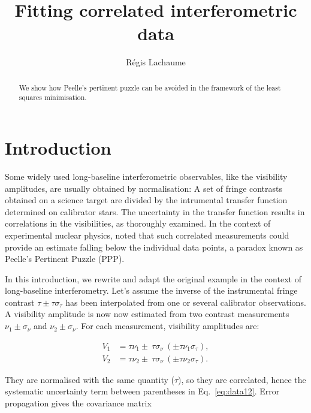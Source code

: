 \documentclass[twocolumn]{article}
\def\norm{_\tau}
\def\meas{_\nu}
\def\system#1#2#3{\ensuremath{#1 \pm\ #2\ (\pm #3)}}
\def\raw{\ensuremath{\nu}}
\def\cot{\ensuremath{\tau}}
\def\data{\ensuremath{{\scriptstyle V}}}
\def\dev{\ensuremath{\sigma}}
\def\reldev{\ensuremath{\dev\norm}}
\def\absdev{\ensuremath{\dev\meas}}
\begin{document}
\title{Fitting correlated interferometric data}
\author{R\'egis Lachaume}
\maketitle

\begin{abstract}
We show how Peelle's pertinent puzzle can be avoided in the framework of the least squares minimisation.
\end{abstract}

\section{Introduction}

Some widely used long-baseline interferometric observables, like the visibility amplitudes, are usually obtained by normalisation: A set of fringe contrasts obtained on a science target are divided by the intrumental transfer function determined on calibrator stars. The uncertainty in the transfer function results in correlations in the visibilities, as \citet{PER03} thoroughly examined.  In the context of experimental nuclear physics, \citet{PEE87} noted that such correlated measurements could provide an estimate falling below the individual data points, a paradox known as Peelle's Pertinent Puzzle (PPP). 

In this introduction, we rewrite and adapt the original example in the context of long-baseline interferometry. Let's assume the inverse of the instrumental fringe contrast $\cot \pm \cot\reldev$ has been interpolated from one or several calibrator observations. A visibility amplitude is now now estimated from two contrast measurements $\raw_1 \pm \absdev$ and $\raw_2 \pm \absdev$.  For each measurement, visibility amplitudes are:

\begin{subequations}
\begin{align}
    \data_1 &= \system{\cot\raw_1}{\cot\absdev}{\cot\raw_1\reldev},\\
    \data_2 &= \system{\cot\raw_2}{\cot\absdev}{\cot\raw_2\reldev}.
\end{align}
\label{eq:data12}
\end{subequations}

They are normalised with the same quantity (\cot), so they are correlated, hence the systematic uncertainty term between parentheses in Eq.~\ref{eq:data12}. Error propagation gives the covariance matrix
\end{document}
